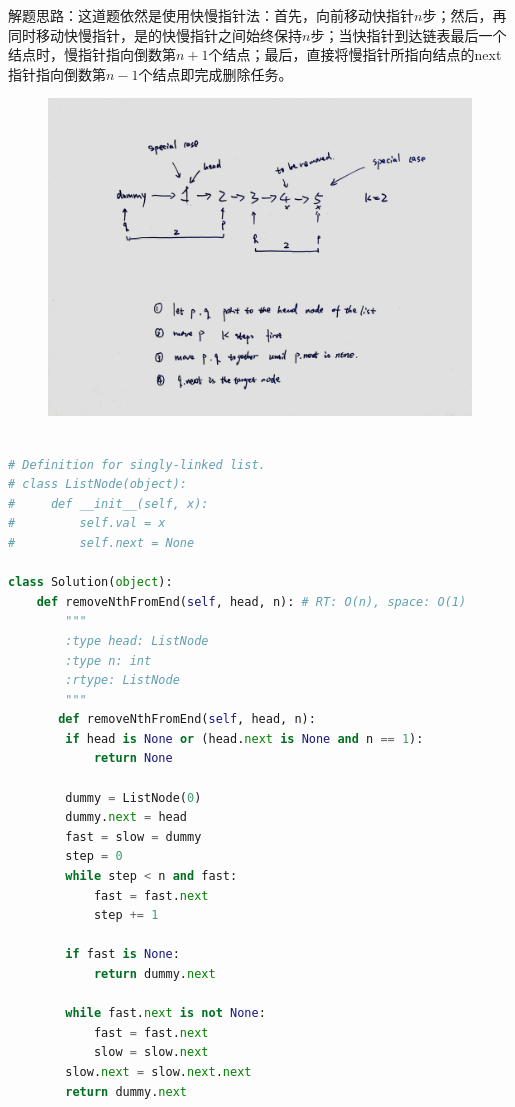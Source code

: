 \documentclass[a4paper,10pt]{article}
\begin{document}
\begin{CJK*}{UTF8}{gbsn}
\noindent 解题思路：这道题依然是使用快慢指针法：首先，向前移动快指针$n$步；然后，再同时移动快慢指针，是的快慢指针之间始终保持$n$步；当快指针到达链表最后一个结点时，慢指针指向倒数第$n+1$个结点；最后，直接将慢指针所指向结点的next指针指向倒数第$n-1$个结点即完成删除任务。
\end{CJK*}

\begin{figure}[h]
    \includegraphics[width=\textwidth]{leetcode19.jpg}
    \centering \\
\end{figure}

\begin{lstlisting}[language=Python, caption=Problem19. Remove $N^{th}$ Node From End of List]

# Definition for singly-linked list.
# class ListNode(object):
#     def __init__(self, x):
#         self.val = x
#         self.next = None

class Solution(object):
    def removeNthFromEnd(self, head, n): # RT: O(n), space: O(1)
        """
        :type head: ListNode
        :type n: int
        :rtype: ListNode
        """
       def removeNthFromEnd(self, head, n):
        if head is None or (head.next is None and n == 1):
            return None

        dummy = ListNode(0)
        dummy.next = head
        fast = slow = dummy
        step = 0
        while step < n and fast:
            fast = fast.next
            step += 1

        if fast is None:
            return dummy.next

        while fast.next is not None:
            fast = fast.next
            slow = slow.next
        slow.next = slow.next.next
        return dummy.next
\end{lstlisting}
\end{document}
